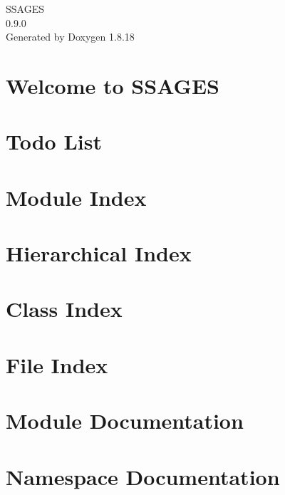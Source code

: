 \let\mypdfximage\pdfximage\def\pdfximage{\immediate\mypdfximage}\documentclass[twoside]{book}
\newcommand{\+}{\discretionary{\mbox{\scriptsize$\hookleftarrow$}}{}{}}
\newcommand{\clearemptydoublepage}{%
  \newpage{\pagestyle{empty}\cleardoublepage}%
}
\begin{document}
\hypersetup{pageanchor=false,
             bookmarksnumbered=true,
             pdfencoding=unicode
            }
\begin{titlepage}
\vspace*{7cm}
\begin{center}%
{\Large S\+S\+A\+G\+ES \\[1ex]\large 0.\+9.\+0 }\\
\vspace*{1cm}
{\large Generated by Doxygen 1.8.18}\\
\end{center}
\end{titlepage}
\clearemptydoublepage
{}
\tableofcontents
\clearemptydoublepage
{}
\hypersetup{pageanchor=true}

\chapter{Welcome to S\+S\+A\+G\+ES}
\label{index}\hypertarget{index}{}
\chapter{Todo List}
\label{todo}

\chapter{Module Index}

\chapter{Hierarchical Index}

\chapter{Class Index}

\chapter{File Index}

\chapter{Module Documentation}




\chapter{Namespace Documentation}



\end{document}
